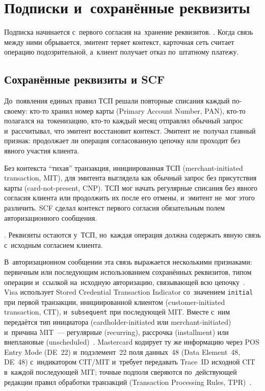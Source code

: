 
\chapter{Подписки и~сохранённые реквизиты}\label{ch:subscriptions}
Подписка начинается с~первого согласия на~хранение реквизитов. . Когда связь между
ними обрывается, эмитент теряет контекст, карточная сеть считает операцию
подозрительной, а~клиент получает отказ по~штатному платежу.

\section{Сохранённые реквизиты и SCF}\label{sec:subscriptions-scf}

До~появления единых правил ТСП решали повторные списания каждый по-своему:
кто-то хранил номер карты (Primary Account Number, PAN), кто-то полагался
на~токенизацию, кто-то каждый месяц отправлял обычный запрос и~рассчитывал,
что эмитент восстановит контекст. Эмитент не~получал главный признак: продолжает ли
операция согласованную цепочку или проходит без явного участия клиента.

Без контекста \enquote{тихая} транзакция, инициированная ТСП
(merchant-initiated transaction, MIT), для эмитента выглядела как обычный запрос без
присутствия карты (card-not-present, CNP). ТСП мог начать регулярные списания
без явного согласия клиента или продолжить их после его отмены, и~эмитент
не~мог этого различить. SCF сделал контекст первого
согласия обязательным полем авторизационного сообщения.

. Реквизиты остаются у~ТСП,
но~каждая операция должна содержать явную связь с~исходным согласием клиента.

В~авторизационном сообщении эта связь выражается несколькими признаками:
первичным или последующим использованием сохранённых реквизитов, типом операции
и~ссылкой на~исходную авторизацию, связывающей всю
цепочку~\cite{mc-tpr,cybs-initial-transactions}. Visa использует Stored
Credential Transaction Indicator со~значением \texttt{initial} при первой
транзакции, инициированной клиентом (customer-initiated transaction, CIT),
и~\texttt{subsequent} при последующей MIT. Вместе с~ним передаётся тип инициатора
(cardholder-initiated или merchant-initiated) и~причина MIT~--- регулярные
(recurring), рассрочка (installment) или внеплановые
(unscheduled)~\cite{visa-scf,cybs-initial-transactions}. Mastercard кодирует ту
же информацию через POS Entry Mode (DE~22) и~подэлемент~22 поля данных~48
(Data Element~48, DE~48) с~индикатором CIT/MIT и~требует передавать Trace~ID
исходной CIT в~каждой последующей MIT; точные подполя сверяются по~действующей
редакции правил обработки транзакций (Transaction Processing Rules,
TPR)~\cite{mc-tpr}.


